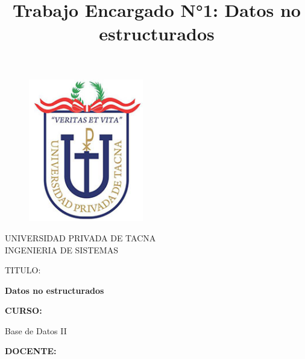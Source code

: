 \documentclass[twoside,twocolumn]{article}
\begin{document}
\title{Trabajo Encargado N°1: Datos no estructurados}

\begin{titlepage}
\begin{figure}[htb]
\begin{center}
\includegraphics[width=5cm]{imagenes/logo.png}
\end{center}
\end{figure}
\vspace*{-0.25in}
\begin{center}
\large{UNIVERSIDAD PRIVADA DE TACNA}\\
\vspace*{-0.025in}
INGENIERIA DE SISTEMAS  \\

\vspace*{0.5in}
\begin{large}
TITULO:\\
\end{large}

\vspace*{0.1in}
\begin{Large}
\textbf{Datos no estructurados} \\
\end{Large}

\vspace*{0.3in}
\begin{Large}
\textbf{CURSO:} \\
\end{Large}

\vspace*{0.1in}
\begin{large}
Base de Datos II\\
\end{large}

\vspace*{0.3in}
\begin{Large}
\textbf{DOCENTE:} \\
\end{Large}


\end{center}
\end{titlepage}
\end{document}
